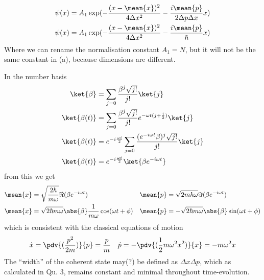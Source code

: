\documentclass[12pt]{article}
\begin{document}
        \begin{align*}
            \psi(x) &= A_1\exp( - \frac{(x-\mean{x})^2}{4\Delta x^2} - \frac{i\mean{p}}{2\Delta p \Delta x} x)\\
            \psi(x) &= A_1\exp( - \frac{(x-\mean{x})^2}{4\Delta x^2} - \frac{i\mean{p}}{\hbar} x)
        \end{align*}
        Where we can rename the normalisation constant \(A_1 = N\), but it will not be the same constant in (a), because dimensions are different.
        
        In the number basis \begin{align*}
            \ket{\beta} &= \sum_{j = 0} \frac{\beta^j \sqrt{j!}}{j!} \ket{j} \\
            \ket{\beta(t)} &= \sum_{j = 0} \frac{\beta^j \sqrt{j!}}{j!} e^{ - \omega t(j + \frac{1}{2})}\ket{j} \\
            \ket{\beta(t)} &= e^{ -i\frac{\omega t}{2}}\sum_{j = 0} \frac{(e^{ -i\omega t}\beta)^j \sqrt{j!}}{j!} \ket{j} \\
            \ket{\beta(t)} &= e^{ -i\frac{\omega t}{2}}\ket{\beta e^{ - i\omega t}} 
        \end{align*}
        from this we get \begin{align*}
            \mean{x} &=  \sqrt{\frac{2\hbar}{m\omega}}\Re(\beta e^{ -i\omega t})& \mean{p} &= \sqrt{2m\hbar\omega}\Im(\beta e^{ -i\omega t})\\
            \mean{x} &=  \sqrt{2\hbar m\omega}\abs{\beta} \frac{1}{m\omega}\cos(\omega t + \phi)& \mean{p} &= -\sqrt{2\hbar m\omega}\abs{\beta} \sin(\omega t + \phi)
        \end{align*}
        which is consistent with the classical equations of motion \begin{align*}
            \dot{x} &= \pdv{(\frac{p^2}{2m})}{p}= \frac{p}{m}& \dot{p} = - \pdv{(\frac{1}{2}m \omega^2 x^2)}{x} = -m\omega^2 x
        \end{align*}
        The ``width'' of the coherent state may(?) be defined as \(\Delta x \Delta p\), which as calculated in Qu. 3, remains constant and minimal throughout time-evolution.
\end{document}
